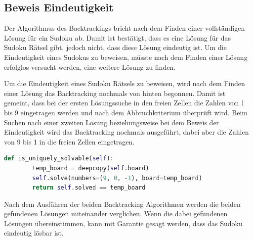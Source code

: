 \subsection{Beweis Eindeutigkeit}
Der Algorithmus des Backtrackings bricht nach dem Finden einer vollständigen Lösung für ein Sudoku ab. Damit ist bestätigt, dass es eine Lösung für das Sudoku Rätsel gibt, jedoch nicht, dass diese Lösung eindeutig ist. Um die Eindeutigkeit eines Sudokus zu beweisen, müsste nach dem Finden einer Lösung erfolglos versucht werden, eine weitere Lösung zu finden.

Um die Eindeutigkeit eines Sudoku Rätsels zu beweisen, wird nach dem Finden einer Lösung das Backtracking nochmals von hinten begonnen. Damit ist gemeint, dass bei der ersten Lösungssuche in den freien Zellen die Zahlen von 1 bis 9 eingetragen werden und nach dem Abbruchkriterium überprüft wird. Beim Suchen nach einer zweiten Lösung beziehungsweise bei dem Beweis der Eindeutigkeit wird das Backtracking nochmals ausgeführt, dabei aber die Zahlen von 9 bis 1 in die freien Zellen eingetragen.

\begin{lstlisting}[language=Python, caption={Überprüfen auf eindeutige Lösbarkeit}, label={lst:uniquesolve}]
	def is_uniquely_solvable(self):
		temp_board = deepcopy(self.board)
		self.solve(numbers=(9, 0, -1), board=temp_board)
		return self.solved == temp_board
\end{lstlisting}

Nach dem Ausführen der beiden Backtracking Algorithmen werden die beiden gefundenen Lösungen miteinander verglichen. Wenn die dabei gefundenen Lösungen übereinstimmen, kann mit Garantie gesagt werden, dass das Sudoku eindeutig lösbar ist.

